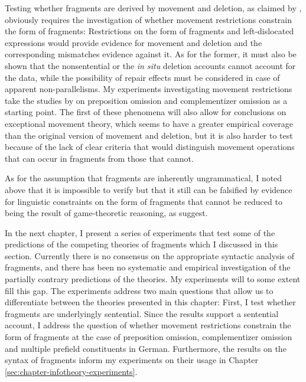 Testing whether fragments are derived by movement and deletion, as claimed by \citet{merchant2004}, obviously requires the investigation of whether movement restrictions constrain the form of fragments: Restrictions on the form of fragments and left-dislocated expressions would provide evidence for movement and deletion and the corresponding mismatches evidence against it. As for the former, it must also be shown that the nonsentential or the \textit{in situ} deletion accounts cannot account for the data, while the possibility of repair effects must be considered in case of apparent non-parallelisms. My experiments investigating movement restrictions take the studies by \citet{merchant.etal2013} on preposition omission and complementizer omission as a starting point. The first of these phenomena will also allow for conclusions on  exceptional movement theory, which seems to have a greater empirical coverage than the original version of movement and deletion, but it is also harder to test because of the lack of clear criteria that would distinguish movement operations that can occur in fragments from those that cannot.

As for the assumption that fragments are inherently ungrammatical, I noted above that it is impossible to verify but that it still can be falsified by evidence for linguistic constraints on the form of fragments that cannot be reduced to being the result of game-theoretic reasoning, as \citet{bergen.goodman2015} suggest.

In the next chapter, I present a series of experiments that test some of the predictions of the competing theories of fragments which I discussed in this section. Currently there is no consensus on the appropriate syntactic analysis of fragments, and there has been no systematic and empirical investigation of the partially contrary predictions of the theories. My experiments will to some extent fill this gap. The experiments address two main questions that allow us to differentiate between the theories presented in this chapter: First, I test whether fragments are underlyingly sentential. Since the results support a sentential account, I  address the question of whether movement restrictions constrain the form of fragments at the case of preposition omission, complementizer omission and multiple prefield constituents in German. Furthermore, the results on the syntax of fragments inform my experiments on their usage in Chapter \ref{sec:chapter-infotheory-experiments}.
